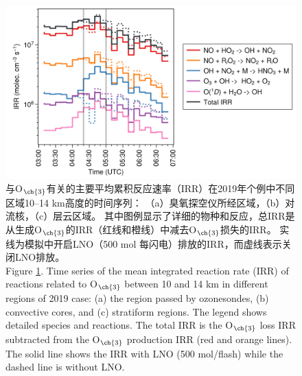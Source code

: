 \begin{figure}[H]
\centering
\includegraphics[width=\textwidth]{./figures/irr_timeseries.png}
\caption{
与O$_{\ch{3}}$有关的主要平均累积反应速率（IRR）在2019年个例中不同区域10--14 km高度的时间序列：
（a）臭氧探空仪所经区域，（b）对流核，（c）层云区域。
其中图例显示了详细的物种和反应，总IRR是从生成O$_{\ch{3}}$的IRR（红线和橙线）中减去O$_{\ch{3}}$损失的IRR。
实线为模拟中开启LNO（500 mol 每闪电）排放的IRR，而虚线表示关闭LNO排放。\\
Figure \ref{fig:irr_timeseries}. Time series of the mean integrated reaction rate (IRR) of reactions related to O$_{\ch{3}}$ between 10 and 14 km in different regions of 2019 case: (a) the region passed by ozonesondes, (b) convective cores, and (c) stratiform regions.
The legend shows detailed species and reactions.
The total IRR is the O$_{\ch{3}}$ loss IRR subtracted from the O$_{\ch{3}}$ production IRR (red and orange lines).
The solid line shows the IRR with LNO (500 mol/flash) while the dashed line is without LNO.
}
\label{fig:irr_timeseries}
\end{figure}
